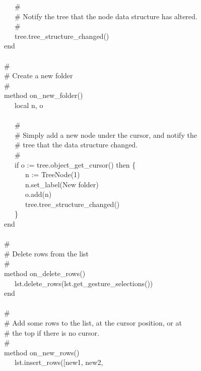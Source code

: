 {\>   \ \ \ \# \\
\>   \ \ \ \# Notify the tree that the node data structure has
altered. \\
\>   \ \ \ \# \\
\>   \ \ \ tree.tree\_structure\_changed() \\
\>   end \\
\ \\
\>   \# \\
\>   \# Create a new folder \\
\>   \# \\
\>   method on\_new\_folder() \\
\>   \ \ \ local n, o \\
\ \\
\>   \ \ \ \# \\
\>   \ \ \ \# Simply add a new node under the cursor, and notify the \\
\>   \ \ \ \# tree that the data structure changed. \\
\>   \ \ \ \# \\
\>   \ \ \ if o := tree.object\_get\_cursor() then \{ \\
\>   \ \ \ \ \ \ n := TreeNode(1) \\
\>   \ \ \ \ \ \ n.set\_label({\textquotedbl}New
folder{\textquotedbl}) \\
\>   \ \ \ \ \ \ o.add(n) \\
\>   \ \ \ \ \ \ tree.tree\_structure\_changed() \\
\>   \ \ \ \} \\
\>   end \\
\ \\
\>   \# \\
\>   \# Delete rows from the list \\
\>   \# \\
\>   method on\_delete\_rows() \\
\>   \ \ \ lst.delete\_rows(lst.get\_gesture\_selections()) \\
\>   end \\
\ \\
\>   \# \\
\>   \# Add some rows to the list, at the cursor position, or at \\
\>   \# the top if there is no cursor. \\
\>   \# \\
\>   method on\_new\_rows() \\
\>   \ \ \ lst.insert\_rows([{\textquotedbl}new1{\textquotedbl},
{\textquotedbl}new2{\textquotedbl},
}
